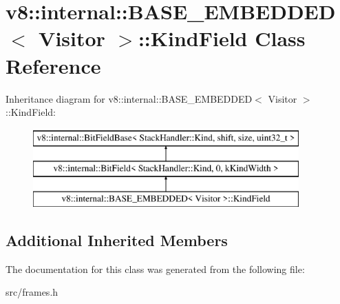 \hypertarget{classv8_1_1internal_1_1_b_a_s_e___e_m_b_e_d_d_e_d_1_1_kind_field}{}\section{v8\+:\+:internal\+:\+:B\+A\+S\+E\+\_\+\+E\+M\+B\+E\+D\+D\+E\+D$<$ Visitor $>$\+:\+:Kind\+Field Class Reference}
\label{classv8_1_1internal_1_1_b_a_s_e___e_m_b_e_d_d_e_d_1_1_kind_field}
Inheritance diagram for v8\+:\+:internal\+:\+:B\+A\+S\+E\+\_\+\+E\+M\+B\+E\+D\+D\+E\+D$<$ Visitor $>$\+:\+:Kind\+Field\+:\begin{figure}[H]
\begin{center}
\leavevmode
\includegraphics[height=3.000000cm]{classv8_1_1internal_1_1_b_a_s_e___e_m_b_e_d_d_e_d_1_1_kind_field}
\end{center}
\end{figure}
\subsection*{Additional Inherited Members}


The documentation for this class was generated from the following file\+:\begin{DoxyCompactItemize}
\item 
src/frames.\+h\end{DoxyCompactItemize}
